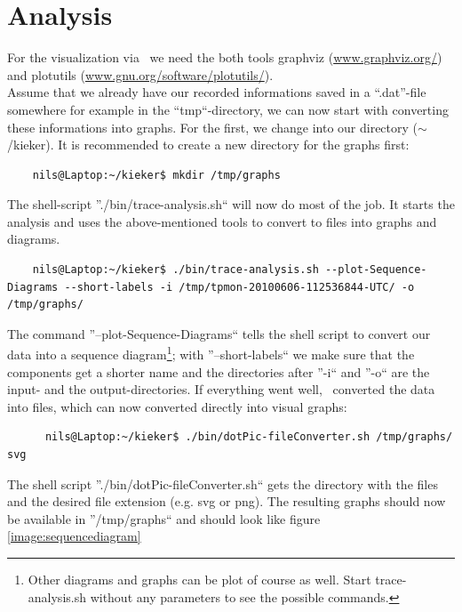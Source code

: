 \section{Analysis}
      For the visualization via \Kieker\ we need the both tools graphviz (\url{www.graphviz.org/}) and plotutils (\url{www.gnu.org/software/plotutils/}).\\
      Assume that we already have our recorded informations saved in a ``.dat''-file somewhere for example in the ``tmp``-directory, we can now start with converting these informations into graphs. For the first, we change into our \Kieker\-directory ($\sim$/kieker). It is recommended to create a new directory for the graphs first:
      \begin{lstlisting}
	nils@Laptop:~/kieker$ mkdir /tmp/graphs
      \end{lstlisting}
      The shell-script ''./bin/trace-analysis.sh`` will now do most of the job. It starts the analysis and uses the above-mentioned tools to convert to files into graphs and diagrams.
      \begin{lstlisting}
	nils@Laptop:~/kieker$ ./bin/trace-analysis.sh --plot-Sequence-Diagrams --short-labels -i /tmp/tpmon-20100606-112536844-UTC/ -o /tmp/graphs/
      \end{lstlisting}
	The command ''--plot-Sequence-Diagrams`` tells the shell script to convert our data into a sequence diagram\footnote{Other diagrams and graphs can be plot of course as well. Start trace-analysis.sh without any parameters to see the possible commands.}; with ''--short-labels`` we make sure that the components get a shorter name and the directories after ''-i`` and ''-o`` are the input- and the output-directories. If everything went well, \Kieker\ converted the data into files, which can now converted directly into visual graphs:
	\begin{lstlisting}
	  nils@Laptop:~/kieker$ ./bin/dotPic-fileConverter.sh /tmp/graphs/ svg
	\end{lstlisting}
	The shell script ''./bin/dotPic-fileConverter.sh`` gets the directory with the files and the desired file extension (e.g. svg or png). The resulting graphs should now be available in ''/tmp/graphs`` and should look like figure \ref{image:sequencediagram}
